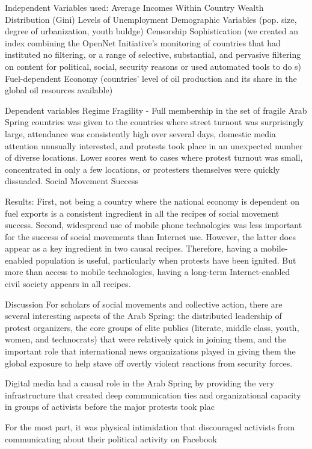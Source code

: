 Independent Variables used:
	Average Incomes Within Country
	Wealth Distribution (Gini)
	Levels of Unemployment
	Demographic Variables (pop. size, degree of urbanization, youth buldge)
	Censorship Sophistication (we created an index combining the OpenNet Initiative’s monitoring of countries that had instituted no filtering, or a range of selective, substantial, and pervasive filtering on content for political, social, security reasons or used automated tools to do s)
	Fuel-dependent Economy (countries’ level of oil production and its share in the global oil resources available)

Dependent variables
	Regime Fragility - Full membership in the set of fragile Arab Spring countries was given to the countries where street turnout was surprisingly large, attendance was consistently high over several days, domestic media attention unusually interested, and protests took place in an unexpected number of diverse locations. Lower scores went to cases where protest turnout was small, concentrated in only a few locations, or protesters themselves were quickly dissuaded.
	Social Movement Success 

Results:
First, not being a country where the national economy is dependent on fuel exports is a consistent ingredient in all the recipes of social movement success. Second, widespread use of mobile phone technologies was less important for the success of social movements than Internet use. However, the latter does appear as a key ingredient in two causal recipes. Therefore, having a mobile-enabled population is useful, particularly when protests have been ignited. But more than access to mobile technologies, having a long-term Internet-enabled civil society appears in all recipes.

Discussion
For scholars of social movements and collective action, there are several
interesting aspects of the Arab Spring: the distributed leadership of protest
organizers, the core groups of elite publics (literate, middle class, youth, women,
and technocrats) that were relatively quick in joining them, and the important
role that international news organizations played in giving them the global exposure
to help stave off overtly violent reactions from security forces.

Digital media had a causal role in the
Arab Spring by providing the very infrastructure that created deep communication
ties and organizational capacity in groups of activists before the major protests
took plac

For the most part, it was physical
intimidation that discouraged activists from communicating about their political
activity on Facebook

